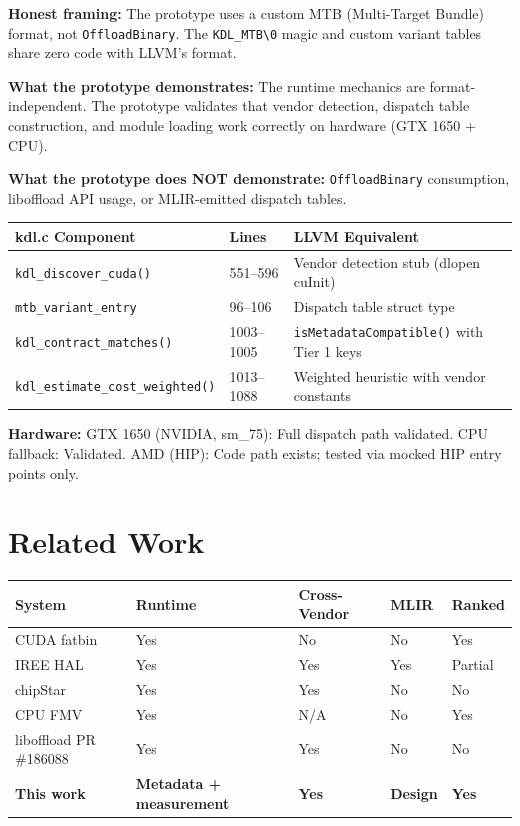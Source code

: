 \documentclass[11pt]{article}
\begin{document}
\textbf{Honest framing:} The prototype uses a custom MTB (Multi-Target Bundle) format, not \texttt{OffloadBinary}.
The \texttt{KDL\_MTB\textbackslash 0} magic and custom variant tables share zero code with LLVM's format.

\textbf{What the prototype demonstrates:} The runtime mechanics are format-independent.
The prototype validates that vendor detection, dispatch table construction, and module loading work correctly on hardware (GTX 1650 + CPU).

\textbf{What the prototype does NOT demonstrate:} \texttt{OffloadBinary} consumption, liboffload API usage, or MLIR-emitted dispatch tables.

\begin{center}
\begin{tabular}{llp{3cm}}
  \toprule
  kdl.c Component & Lines & LLVM Equivalent \\
  \midrule
  \texttt{kdl\_discover\_cuda()} & 551--596 & Vendor detection stub (dlopen cuInit) \\
  \texttt{mtb\_variant\_entry} & 96--106 & Dispatch table struct type \\
  \texttt{kdl\_contract\_matches()} & 1003--1005 & \texttt{isMetadataCompatible()} with Tier 1 keys \\
  \texttt{kdl\_estimate\_cost\_weighted()} & 1013--1088 & Weighted heuristic with vendor constants \\
  \bottomrule
\end{tabular}
\end{center}

\textbf{Hardware:}
GTX 1650 (NVIDIA, sm\_75): Full dispatch path validated.
CPU fallback: Validated.
AMD (HIP): Code path exists; tested via mocked HIP entry points only.

\section{Related Work}

\begin{center}
\begin{tabular}{lllll}
  \toprule
  System & Runtime & Cross-Vendor & MLIR & Ranked \\
  \midrule
  CUDA fatbin & Yes & No & No & Yes \\
  IREE HAL & Yes & Yes & Yes & Partial \\
  chipStar & Yes & Yes & No & No \\
  CPU FMV & Yes & N/A & No & Yes \\
  liboffload PR \#186088 & Yes & Yes & No & No \\
  \textbf{This work} & \textbf{Metadata + measurement} & \textbf{Yes} & \textbf{Design} & \textbf{Yes} \\
  \bottomrule
\end{tabular}
\end{center}
\end{document}
